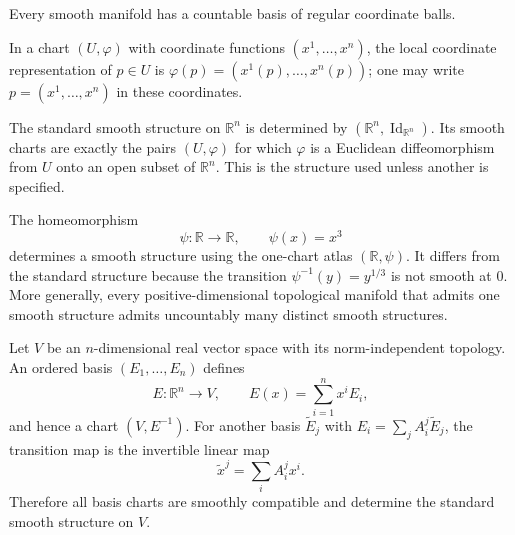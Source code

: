 \begin{proposition}
\label{prop:1-19}
\leanok
{}
Every smooth manifold has a countable basis of regular coordinate balls.
\end{proposition}


\begin{notation}
\label{not:1-3-extra-2}
\mathlibok
In a chart $(U,\varphi)$ with coordinate functions $(x^1,\ldots,x^n)$, the
local coordinate representation of $p\in U$ is
$\varphi(p)=(x^1(p),\ldots,x^n(p))$; one may write
$p=(x^1,\ldots,x^n)$ in these coordinates.
\end{notation}


\begin{example}
\label{ex:1-22}
\leanok
{}
The standard smooth structure on $\mathbb R^n$ is determined by
$(\mathbb R^n,\operatorname{Id}_{\mathbb R^n})$. Its smooth charts are exactly
the pairs $(U,\varphi)$ for which $\varphi$ is a Euclidean diffeomorphism from
$U$ onto an open subset of $\mathbb R^n$. This is the structure used unless
another is specified.
\end{example}

\begin{example}
\label{ex:1-23}
\leanok
{}
The homeomorphism
\[
\psi:\mathbb R\to\mathbb R,\qquad \psi(x)=x^3 \tag{1.1}
\]
determines a smooth structure using the one-chart atlas
$(\mathbb R,\psi)$. It differs from the standard structure because the
transition $\psi^{-1}(y)=y^{1/3}$ is not smooth at $0$.
More generally, every positive-dimensional topological manifold that admits
one smooth structure admits uncountably many distinct smooth structures.
\end{example}

\begin{example}
\label{ex:1-24}
\leanok
{}
Let $V$ be an $n$-dimensional real vector space with its norm-independent
topology. An ordered basis $(E_1,\ldots,E_n)$ defines
\[
E:\mathbb R^n\to V,\qquad E(x)=\sum_{i=1}^n x^iE_i,
\]
and hence a chart $(V,E^{-1})$. For another basis $\widetilde E_j$ with
$E_i=\sum_j A_i^j\widetilde E_j$, the transition map is the invertible linear
map
\[
\widetilde x^j=\sum_i A_i^j x^i.
\]
Therefore all basis charts are smoothly compatible and determine the standard
smooth structure on $V$.
\end{example}

